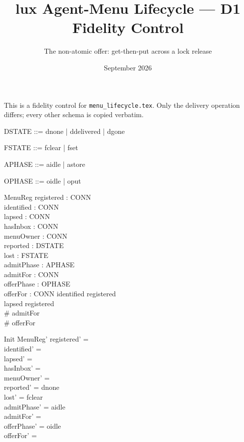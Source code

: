 \documentclass[a4paper,10pt,fleqn]{article}
\begin{document}
\title{lux Agent-Menu Lifecycle --- D1 Fidelity Control}
\author{The non-atomic offer: get-then-put across a lock release}
\date{September 2026}
\maketitle

This is a fidelity control for \texttt{menu\_lifecycle.tex}. Only the
delivery operation differs; every other schema is copied verbatim.

\begin{zed}
  [CONN]
\end{zed}

\begin{zed}
  DSTATE ::= dnone | ddelivered | dgone
\end{zed}

\begin{zed}
  FSTATE ::= fclear | fset
\end{zed}

\begin{zed}
  APHASE ::= aidle | astore
\end{zed}

\begin{zed}
  OPHASE ::= oidle | oput
\end{zed}

\begin{schema}{MenuReg}
  registered : \power CONN \\
  identified : \power CONN \\
  lapsed : \power CONN \\
  hasInbox : \power CONN \\
  menuOwner : \power CONN \\
  reported : DSTATE \\
  lost : FSTATE \\
  admitPhase : APHASE \\
  admitFor : \power CONN \\
  offerPhase : OPHASE \\
  offerFor : \power CONN
\where
  identified \subseteq registered \\
  lapsed \subseteq registered \\
  \# admitFor  \\
  \# offerFor 
\end{schema}

\begin{schema}{Init}
  MenuReg'
\where
  registered' = \emptyset \\
  identified' = \emptyset \\
  lapsed' = \emptyset \\
  hasInbox' = \emptyset \\
  menuOwner' = \emptyset \\
  reported' = dnone \\
  lost' = fclear \\
  admitPhase' = aidle \\
  admitFor' = \emptyset \\
  offerPhase' = oidle \\
  offerFor' = \emptyset
\end{schema}
\end{document}
